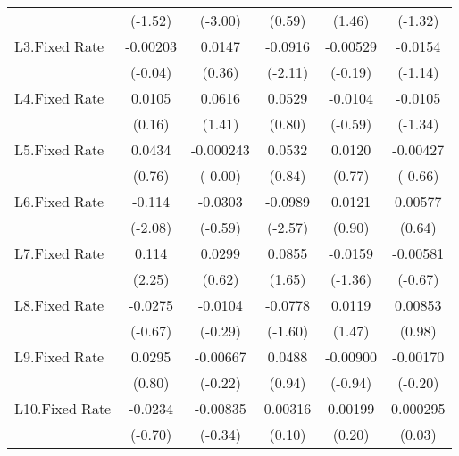 {\begin{longtable}{l*{5}{c}}
                &  (-1.52)         &  (-3.00)         &   (0.59)         &   (1.46)         &  (-1.32)         \\
[1em]
L3.Fixed Rate   & -0.00203         &   0.0147         &  -0.0916\sym{*}  & -0.00529         &  -0.0154         \\
                &  (-0.04)         &   (0.36)         &  (-2.11)         &  (-0.19)         &  (-1.14)         \\
[1em]
L4.Fixed Rate   &   0.0105         &   0.0616         &   0.0529         &  -0.0104         &  -0.0105         \\
                &   (0.16)         &   (1.41)         &   (0.80)         &  (-0.59)         &  (-1.34)         \\
[1em]
L5.Fixed Rate   &   0.0434         &-0.000243         &   0.0532         &   0.0120         & -0.00427         \\
                &   (0.76)         &  (-0.00)         &   (0.84)         &   (0.77)         &  (-0.66)         \\
[1em]
L6.Fixed Rate   &   -0.114\sym{*}  &  -0.0303         &  -0.0989\sym{*}  &   0.0121         &  0.00577         \\
                &  (-2.08)         &  (-0.59)         &  (-2.57)         &   (0.90)         &   (0.64)         \\
[1em]
L7.Fixed Rate   &    0.114\sym{*}  &   0.0299         &   0.0855         &  -0.0159         & -0.00581         \\
                &   (2.25)         &   (0.62)         &   (1.65)         &  (-1.36)         &  (-0.67)         \\
[1em]
L8.Fixed Rate   &  -0.0275         &  -0.0104         &  -0.0778         &   0.0119         &  0.00853         \\
                &  (-0.67)         &  (-0.29)         &  (-1.60)         &   (1.47)         &   (0.98)         \\
[1em]
L9.Fixed Rate   &   0.0295         & -0.00667         &   0.0488         & -0.00900         & -0.00170         \\
                &   (0.80)         &  (-0.22)         &   (0.94)         &  (-0.94)         &  (-0.20)         \\
[1em]
L10.Fixed Rate  &  -0.0234         & -0.00835         &  0.00316         &  0.00199         & 0.000295         \\
                &  (-0.70)         &  (-0.34)         &   (0.10)         &   (0.20)         &   (0.03)         \\

\end{longtable}}
